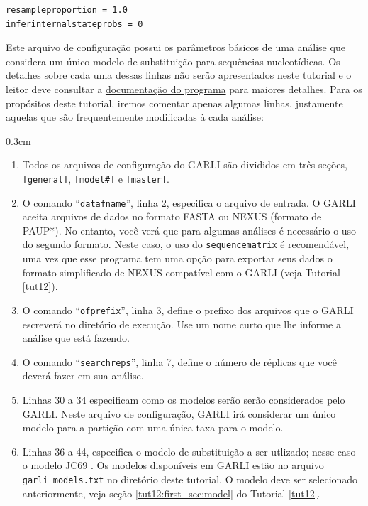 \begin{refsection}
\begin{lstlisting}[basicstyle=\scriptsize]
resampleproportion = 1.0
inferinternalstateprobs = 0
\end{lstlisting}

Este arquivo de configuração possui os parâmetros básicos de uma análise que considera um único modelo de substituição para sequências nucleotídicas. Os detalhes sobre cada uma dessas linhas não serão apresentados neste tutorial e o leitor deve consultar a \href{https://molevol.mbl.edu/index.php/GARLI_Configuration_Settings}{documentação do programa} para maiores detalhes. Para os propósitos deste tutorial, iremos comentar apenas algumas linhas, justamente aquelas que são frequentemente modificadas à cada análise:


\begin {myindentpar}{0.3cm}
\begin{enumerate}[\itshape i.]

    \item{Todos os arquivos de configuração do GARLI são divididos em três seções, \texttt{[general]}, \texttt{[model\#]} e \texttt{[master]}.}

    \item{O comando ``\texttt{datafname}'', linha 2, especifica o arquivo de entrada. O GARLI aceita arquivos de dados no formato FASTA ou NEXUS (formato de PAUP*). No entanto, você verá que para algumas análises é necessário o uso do segundo formato. Neste caso, o uso do \texttt{sequencematrix} é recomendável, uma vez que esse programa tem uma opção para exportar seus dados o formato simplificado de NEXUS compatível com o GARLI (veja Tutorial \ref{tut12}).} 

    \item{O comando ``\texttt{ofprefix}'', linha 3, define o prefixo dos arquivos que o GARLI escreverá no diretório de execução. Use um nome curto que lhe informe a análise que está fazendo.} 

    \item{O comando ``\texttt{searchreps}'', linha 7, define o número de réplicas que você deverá fazer em sua análise.} 

    \item{Linhas 30 a 34 especificam como os modelos serão serão considerados pelo GARLI. Neste arquivo de configuração, GARLI irá considerar um único modelo para a partição com uma única taxa para o modelo.}

    \item{Linhas 36 a 44, especifica o modelo de substituição a ser utlizado; nesse caso o modelo JC69 \parencite[][]{Jukes_and_Cantor_1969}. Os modelos disponíveis em GARLI estão no arquivo \texttt{garli\_models.txt} no diretório deste tutorial. O modelo deve ser selecionado anteriormente, veja seção \ref{tut12:first_sec:model} do Tutorial \ref{tut12}.}


\end{enumerate}
\end{myindentpar}
\end{refsection}

